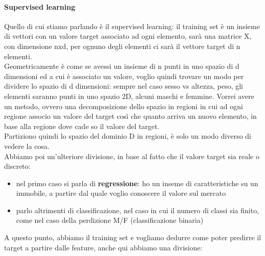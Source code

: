 \documentclass[12pt, oneside]{extbook}
\begin{document}
\paragraph{Supervised learning}
Quello di cui stiamo parlando è il supervised learning: il training set è un insieme di vettori con un valore target associato ad ogni elemento, sarà una matrice X, con dimensione nxd, per ognuno degli elementi ci sarà il vettore target di n elementi.\\Geometricamente è come se avessi un insieme di n punti in uno spazio di d dimensioni ed a cui è associato un valore, voglio quindi trovare un modo per dividere lo spazio di d dimensioni: sempre nel caso sesso vs altezza, peso, gli elementi saranno punti in uno spazio 2D, alcuni maschi e femmine. Vorrei avere un metodo, ovvero una decomposizione dello spazio in regioni in cui ad ogni regione associo un valore del target così che quanto arriva un nuovo elemento, in base alla regione dove cade so il valore del target.\\Partiziono quindi lo spazio del dominio D in regioni, è solo un modo diverso di vedere la cosa.\\Abbiamo poi un'ulteriore divisione, in base al fatto che il valore target sia reale o discreto:
\begin{itemize}
	\item nel primo caso si parla di \textbf{regressione}: ho un inseme di caratteristiche su un immobile, a partire dal quale voglio conoscere il valore sul mercato
	\item parlo altrimenti di classificazione, nel caso in cui il numero di classi sia finito, come nel caso della perdizione M/F (classificazione binaria)
\end{itemize}
A questo punto, abbiamo il training set e vogliamo dedurre come poter predirre il target a partire dalle feature, anche qui abbiamo una divisione:
\end{document}
